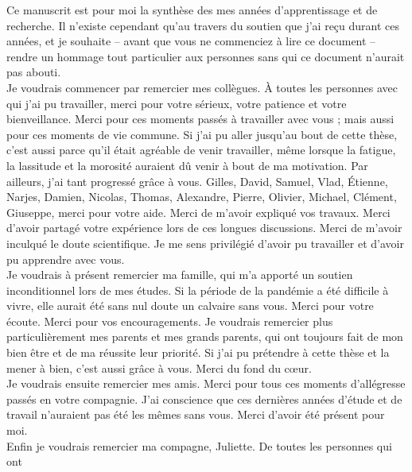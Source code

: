 Ce manuscrit est pour moi la synthèse des mes années d'apprentissage et de recherche. Il n'existe cependant qu'au travers du soutien que j'ai reçu durant ces années, et je souhaite -- avant que vous ne commenciez à lire ce document -- rendre un hommage tout particulier aux personnes sans qui ce document n'aurait pas abouti.\\

Je voudrais commencer par remercier mes collègues. À toutes les personnes avec qui j'ai pu travailler, merci pour votre sérieux, votre patience et votre bienveillance. Merci pour ces moments passés à travailler avec vous ; mais aussi pour ces moments de vie commune. Si j'ai pu aller jusqu'au bout de cette thèse, c'est aussi parce qu'il était agréable de venir travailler, même lorsque la fatigue, la lassitude et la morosité auraient dû venir à bout de ma motivation. Par ailleurs, j'ai tant progressé grâce à vous. Gilles, David, Samuel, Vlad, Étienne, Narjes, Damien, Nicolas, Thomas, Alexandre, Pierre, Olivier, Michael, Clément, Giuseppe, merci pour votre aide. Merci de m'avoir expliqué vos travaux. Merci d'avoir partagé votre expérience lors de ces longues discussions. Merci de m'avoir inculqué le doute scientifique. Je me sens privilégié d'avoir pu travailler et d'avoir pu apprendre avec vous.\\

Je voudrais à présent remercier ma famille, qui m'a apporté un soutien inconditionnel lors de mes études. Si la période de la pandémie a été difficile à vivre, elle aurait été sans nul doute un calvaire sans vous. Merci pour votre écoute. Merci pour vos encouragements. Je voudrais remercier plus particulièrement mes parents et mes grands parents, qui ont toujours fait de mon bien être et de ma réussite leur priorité. Si j'ai pu prétendre à cette thèse et la mener à bien, c'est aussi grâce à vous. Merci du fond du cœur.\\

Je voudrais ensuite remercier mes amis. Merci pour tous ces moments d'allégresse passés en votre compagnie. J'ai conscience que ces dernières années d'étude et de travail n'auraient pas été les mêmes sans vous. Merci d'avoir été présent pour moi.\\

Enfin je voudrais remercier ma compagne, Juliette. De toutes les personnes qui ont 
